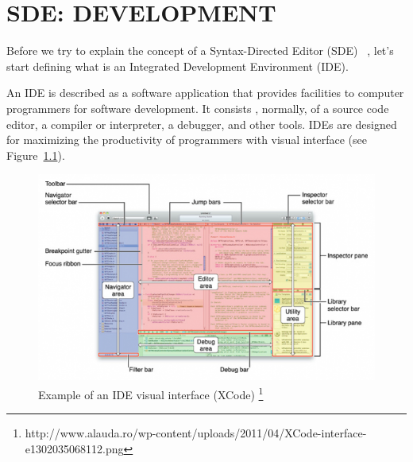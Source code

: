 \documentclass[
  oneside,
  11pt, a4paper,
  footinclude=true,
  headinclude=true,
  cleardoublepage=empty
]{scrbook}
\begin{document}





\chapter{SDE: DEVELOPMENT}

Before we try to explain the concept of a Syntax-Directed Editor (SDE) ~\citep{RT89b,Ko05,alsCH10a,TR81a,RMT86a,RT89a,AHW89}, let's start defining what is an Integrated Development Environment (IDE).

An IDE is described as a software application that provides facilities to computer programmers for software development. It consists , normally, of a source code editor, a compiler or interpreter, a debugger, and other tools.
IDEs are designed for maximizing the productivity of programmers with visual interface (see Figure~\ref{fig:ideXCode}).


\begin{figure}[h!]
  \centering
    \includegraphics[width=1\textwidth]{img/XCode-interface.png}
    \caption{Example of an IDE visual interface (XCode) \protect\footnote{http://www.alauda.ro/wp-content/uploads/2011/04/XCode-interface-e1302035068112.png}}
    \label{fig:ideXCode}
\end{figure}
\end{document}
